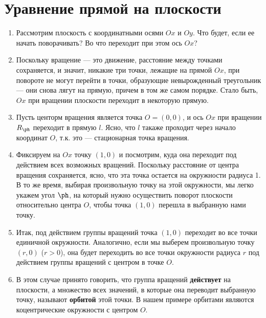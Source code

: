 \label{LinearEqs}


\section{Уравнение прямой на плоскости}


\begin{enumerate}
\item Рассмотрим плоскость с координатными осями $Ox$ и $Oy$. Что будет, если ее начать поворачивать? Во что переходит при этом ось $Ox$?
\item Поскольку вращение --- это движение, расстояние между точками сохраняется, и значит, никакие три точки, лежащие на прямой $Ox$, при повороте не могут перейти в точки, образующие невырожденный треугольник --- они снова лягут на прямую, причем в том же самом порядке. Стало быть, $Ox$ при вращении плоскости переходит в некоторую прямую.
\item Пусть центорм вращения является точка $O=(0,0)$, и ось $Ox$ при вращении $R_\ph$ переходит в прямую $l$. Ясно, что $l$ такаже проходит через начало координат $O$, т.к. это --- стационарная точка вращения.
\item Фиксируем на $Ox$ точку $(1,0)$ и посмотрим, куда она переходит под действием всех возможных вращений. Поскольку расстояние от центра вращения сохраняется, ясно, что эта точка остается на окружности радиуса 1. В то же время, выбирая произвольную точку на этой окружности, мы легко укажем угол $\ph$, на который нужно осуществить поворот плоскости относительно центра $O$, чтобы точка $(1,0)$ перешла в выбранную нами точку.
\item Итак, под действием группы вращений точка $(1,0)$ переходит во все точки единичной окружности. Аналогично, если мы выберем произвольную точку $(r,0)$ ($r>0$), она будет переходить во все точки окружности радиуса $r$ под действием группы вращений с центром в точке $O$.
\item В этом случае принято говорить, что группа вращений \textbf{действует} на плоскости, а множество всех значений, в которые она переводит выбранную точку, называют \textbf{орбитой} этой точки. В нашем примере орбитами являются коцентрические окружности с центром $O$.

\end{enumerate}
